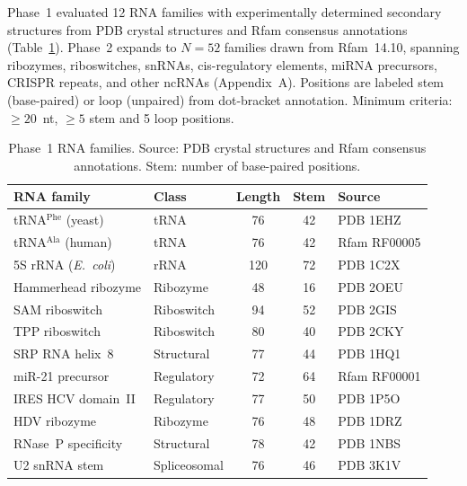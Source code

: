 \documentclass[11pt]{article}
\begin{document}
Phase~1 evaluated 12 RNA families with experimentally determined
secondary structures from PDB crystal structures and Rfam consensus
annotations (Table~\ref{tab:rna_families}).  Phase~2 expands to
$N = 52$ families drawn from Rfam~14.10, spanning ribozymes,
riboswitches, snRNAs, cis-regulatory elements, miRNA precursors,
CRISPR repeats, and other ncRNAs (Appendix~A).  Positions are labeled
stem (base-paired) or loop (unpaired) from dot-bracket annotation.
Minimum criteria: $\geq 20$~nt, $\geq 5$ stem and 5 loop positions.

\begin{table}[t]
\centering
\caption{Phase~1 RNA families.  Source: PDB crystal structures and
  Rfam consensus annotations.  Stem: number of base-paired positions.}
\label{tab:rna_families}
\small
\begin{tabular}{@{}llccl@{}}
\toprule
\textbf{RNA family} & \textbf{Class} & \textbf{Length} &
  \textbf{Stem} & \textbf{Source} \\
\midrule
tRNA$^{\mathrm{Phe}}$ (yeast)  & tRNA         & 76  & 42 & PDB 1EHZ \\
tRNA$^{\mathrm{Ala}}$ (human)  & tRNA         & 76  & 42 & Rfam RF00005 \\
5S rRNA (\textit{E.\ coli})    & rRNA         & 120 & 72 & PDB 1C2X \\
Hammerhead ribozyme             & Ribozyme     & 48  & 16 & PDB 2OEU \\
SAM riboswitch                  & Riboswitch   & 94  & 52 & PDB 2GIS \\
TPP riboswitch                  & Riboswitch   & 80  & 40 & PDB 2CKY \\
SRP RNA helix~8                 & Structural   & 77  & 44 & PDB 1HQ1 \\
miR-21 precursor                & Regulatory   & 72  & 64 & Rfam RF00001 \\
IRES HCV domain~II              & Regulatory   & 77  & 50 & PDB 1P5O \\
HDV ribozyme                    & Ribozyme     & 76  & 48 & PDB 1DRZ \\
RNase~P specificity             & Structural   & 78  & 42 & PDB 1NBS \\
U2 snRNA stem                   & Spliceosomal & 76  & 46 & PDB 3K1V \\
\bottomrule
\end{tabular}
\end{table}
\end{document}
